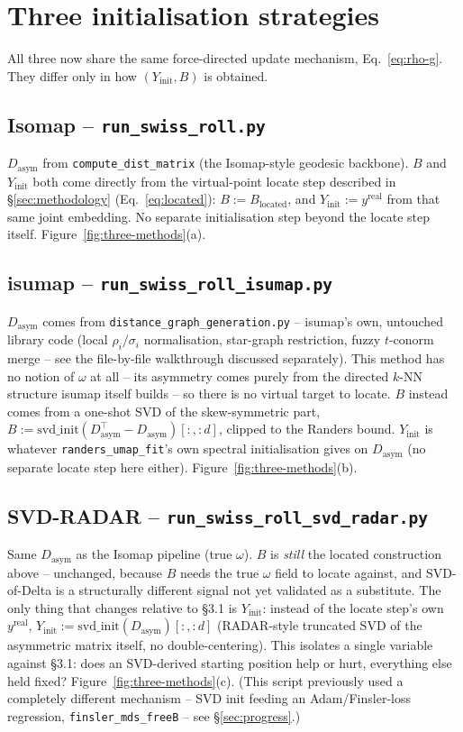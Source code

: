 \documentclass[11pt]{article}
\begin{document}
\section{Three initialisation strategies}
\label{sec:three-methods}

All three now share the same force-directed update mechanism, Eq.~\eqref{eq:rho-g}. They differ
only in how $(Y_{\mathrm{init}}, B)$ is obtained.

\subsection{Isomap -- \texttt{run\_swiss\_roll.py}}
$D_{\mathrm{asym}}$ from \texttt{compute\_dist\_matrix} (the Isomap-style geodesic backbone). $B$
and $Y_{\mathrm{init}}$ both come directly from the virtual-point locate step described in
\S\ref{sec:methodology} (Eq.~\eqref{eq:located}): $B:=B_{\mathrm{located}}$, and
$Y_{\mathrm{init}}:=y^{\mathrm{real}}$ from that same joint embedding. No separate initialisation
step beyond the locate step itself. Figure~\ref{fig:three-methods}(a).

\subsection{isumap -- \texttt{run\_swiss\_roll\_isumap.py}}
$D_{\mathrm{asym}}$ comes from \texttt{distance\_graph\_generation.py} -- isumap's own, untouched
library code (local $\rho_i/\sigma_i$ normalisation, star-graph restriction, fuzzy $t$-conorm
merge -- see the file-by-file walkthrough discussed separately). This method has no notion of
$\omega$ at all -- its asymmetry comes purely from the directed $k$-NN structure isumap itself
builds -- so there is no virtual target to locate. $B$ instead comes from a one-shot SVD of the
skew-symmetric part, $B:=\mathrm{svd\_init}(D_{\mathrm{asym}}^\top-D_{\mathrm{asym}})[:, :d]$,
clipped to the Randers bound. $Y_{\mathrm{init}}$ is whatever \texttt{randers\_umap\_fit}'s own
spectral initialisation gives on $D_{\mathrm{asym}}$ (no separate locate step here either).
Figure~\ref{fig:three-methods}(b).

\subsection{SVD-RADAR -- \texttt{run\_swiss\_roll\_svd\_radar.py}}
Same $D_{\mathrm{asym}}$ as the Isomap pipeline (true $\omega$). $B$ is \emph{still} the located
construction above -- unchanged, because $B$ needs the true $\omega$ field to locate against, and
SVD-of-Delta is a structurally different signal not yet validated as a substitute. The only thing
that changes relative to \S3.1 is $Y_{\mathrm{init}}$: instead of the locate step's own
$y^{\mathrm{real}}$, $Y_{\mathrm{init}}:=\mathrm{svd\_init}(D_{\mathrm{asym}})[:,:d]$ (RADAR-style
truncated SVD of the asymmetric matrix itself, no double-centering). This isolates a single
variable against \S3.1: does an SVD-derived starting position help or hurt, everything else held
fixed? Figure~\ref{fig:three-methods}(c). (This script previously used a completely different
mechanism -- SVD init feeding an Adam/Finsler-loss regression, \texttt{finsler\_mds\_freeB} -- see
\S\ref{sec:progress}.)
\end{document}
